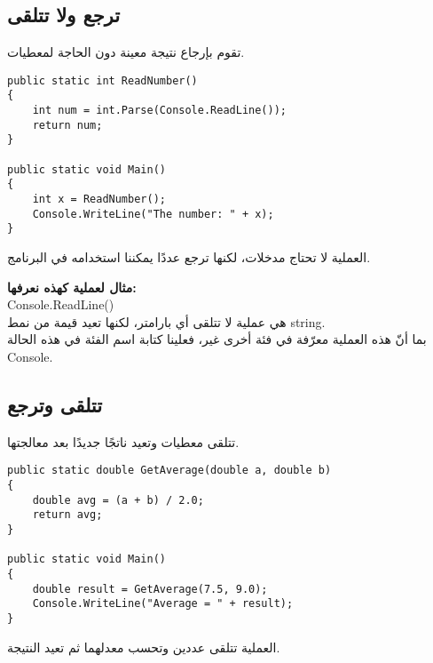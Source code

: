 \documentclass[12pt]{article}
\begin{document}
\subsection{ترجع ولا تتلقى}
تقوم بإرجاع نتيجة معينة دون الحاجة لمعطيات.

\begin{boxExample}
\begin{english}
\begin{verbatim}
public static int ReadNumber()
{
    int num = int.Parse(Console.ReadLine());
    return num;
}

public static void Main()
{
    int x = ReadNumber();
    Console.WriteLine("The number: " + x);
}
\end{verbatim}
\end{english}
\end{boxExample}

العملية لا تحتاج مدخلات، لكنها ترجع عددًا يمكننا استخدامه في البرنامج.

\textbf{مثال لعملية كهذه نعرفها:} \\
\textenglish{Console.ReadLine()} \\
هي عملية لا تتلقى أي بارامتر، لكنها تعيد قيمة من نمط \textenglish{string}. \\
بما أنّ هذه العملية معرّفة في فئة أخرى غير، فعلينا كتابة اسم الفئة في هذه الحالة \textenglish{Console}.

\subsection{تتلقى وترجع}
تتلقى معطيات وتعيد ناتجًا جديدًا بعد معالجتها.

\begin{boxExample}
\begin{english}
\begin{verbatim}
public static double GetAverage(double a, double b)
{
    double avg = (a + b) / 2.0;
    return avg;
}

public static void Main()
{
    double result = GetAverage(7.5, 9.0);
    Console.WriteLine("Average = " + result);
}
\end{verbatim}
\end{english}
\end{boxExample}

العملية تتلقى عددين وتحسب معدلهما ثم تعيد النتيجة.
\end{document}
